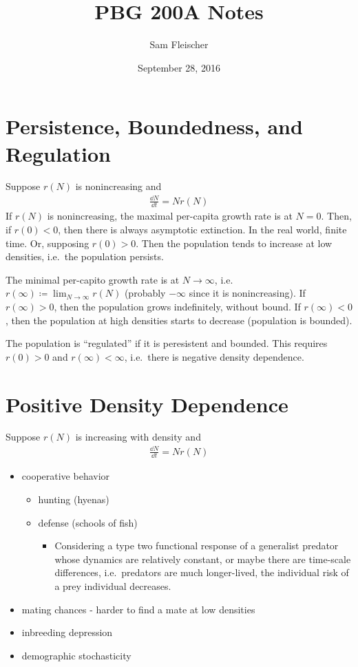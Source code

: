 \documentclass{article}
\title{PBG 200A Notes}
\author{Sam Fleischer}
\date{September 28, 2016}
\begin{document}
    \maketitle

    \section{Persistence, Boundedness, and Regulation}
        Suppose $r(N)$ is nonincreasing and 
        \begin{align}
            \frac{\dd N}{\dd t} = Nr(N)
        \end{align}
        If $r(N)$ is nonincreasing, the maximal per-capita growth rate is at $N=0$.  Then, if $r(0) < 0$, then there is always asymptotic extinction.  In the real world, finite time.  Or, supposing $r(0) > 0$.  Then the population tends to increase at low densities, i.e.~the population persists.

        The minimal per-capito growth rate is at $N \rightarrow \infty$, i.e.~$r(\infty) \coloneqq \displaystyle\lim_{N\rightarrow\infty}r(N)$ (probably $-\infty$ since it is nonincreasing).  If $r(\infty) > 0$, then the population grows indefinitely, without bound.  If $r(\infty) < 0$, then the population at high densities starts to decrease (population is bounded).

        The population is ``regulated'' if it is peresistent and bounded.  This requires $r(0) > 0$ and $r(\infty)<\infty$, i.e.~there is negative density dependence.

    \section{Positive Density Dependence}
        Suppose $r(N)$ is increasing with density and
        \begin{align}
            \frac{\dd N}{\dd t} = Nr(N)
        \end{align}
        \begin{itemize}
            \item cooperative behavior
            \begin{itemize}
                \item hunting (hyenas)
                \item defense (schools of fish)
                \begin{itemize}
                    \item Considering a type two functional response of a generalist predator whose dynamics are relatively constant, or maybe there are time-scale differences, i.e.~predators are much longer-lived, the individual risk of a prey individual decreases.
                \end{itemize}
            \end{itemize}
            \item mating chances - harder to find a mate at low densities
            \item inbreeding depression
            \item demographic stochasticity
        \end{itemize}
\end{document}
